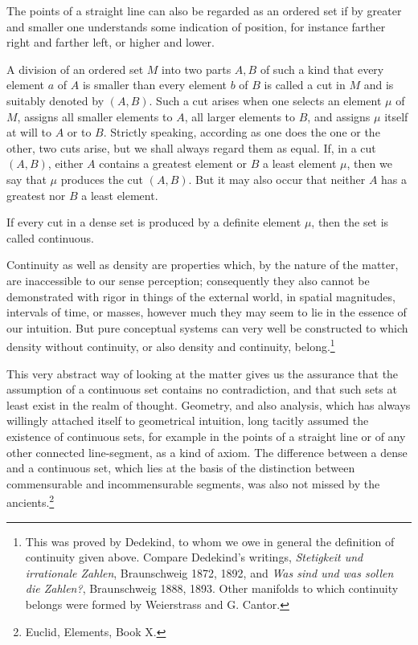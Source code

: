 \documentclass[11pt]{article}
\begin{document}
The points of a straight line can also be regarded as an ordered set if by greater and smaller one understands some indication of position, for instance farther right and farther left, or higher and lower.

A division of an ordered set $M$ into two parts $A,B$ of such a kind that every element $a$ of $A$ is smaller than every element $b$ of $B$ is called a cut in $M$ and is suitably denoted by $(A,B)$. Such a cut arises when one selects an element $\mu$ of $M$, assigns all smaller elements to $A$, all larger elements to $B$, and assigns $\mu$ itself at will to $A$ or to $B$. Strictly speaking, according as one does the one or the other, two cuts arise, but we shall always regard them as equal. If, in a cut $(A,B)$, either $A$ contains a greatest element or $B$ a least element $\mu$, then we say that $\mu$ produces the cut $(A,B)$. But it may also occur that neither $A$ has a greatest nor $B$ a least element.

If every cut in a dense set is produced by a definite element $\mu$, then the set is called continuous.

Continuity as well as density are properties which, by the nature of the matter, are inaccessible to our sense perception; consequently they also cannot be demonstrated with rigor in things of the external world, in spatial magnitudes, intervals of time, or masses, however much they may seem to lie in the essence of our intuition. But pure conceptual systems can very well be constructed to which density without continuity, or also density and continuity, belong.\footnote{This was proved by Dedekind, to whom we owe in general the definition of continuity given above. Compare Dedekind's writings, \emph{Stetigkeit und irrationale Zahlen}, Braunschweig 1872, 1892, and \emph{Was sind und was sollen die Zahlen?}, Braunschweig 1888, 1893. Other manifolds to which continuity belongs were formed by Weierstrass and G. Cantor.}


This very abstract way of looking at the matter gives us the assurance that the assumption of a continuous set contains no contradiction, and that such sets at least exist in the realm of thought. Geometry, and also analysis, which has always willingly attached itself to geometrical intuition, long tacitly assumed the existence of continuous sets, for example in the points of a straight line or of any other connected line-segment, as a kind of axiom. The difference between a dense and a continuous set, which lies at the basis of the distinction between commensurable and incommensurable segments, was also not missed by the ancients.\footnote{Euclid, Elements, Book X.}
\end{document}
